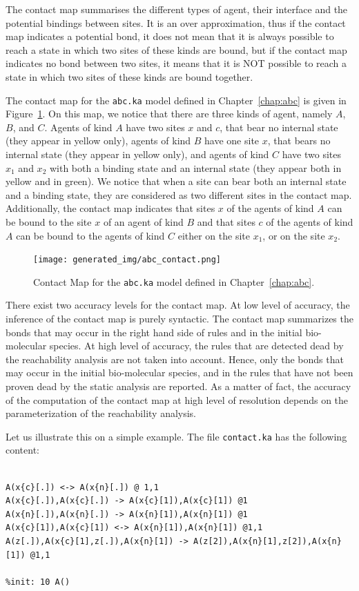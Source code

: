 \documentclass[11pt]{book}
\def\ttt#1{\texttt{#1}}
\begin{document}
The contact map summarises the different types of agent, their interface and the potential bindings between sites. It is an over approximation, thus if the contact map indicates a potential bond, it does not mean that it is always possible to reach a state in which two sites of these kinds are bound, but if the contact map indicates no bond between two sites, it means that it is NOT possible to reach a state in which two sites of these kinds are bound together.


The contact map for the \ttt{abc.ka} model  defined in Chapter~\ref{chap:abc} is given in Figure~\ref{fig:abc-contact}. On this map, we notice that there are three kinds of agent, namely $A$, $B$, and $C$.
Agents of kind $A$ have two sites $x$ and $c$, that bear no internal state (they appear in yellow only), agents of kind $B$ have one site $x$, that bears no internal state (they appear in yellow only), and agents of kind $C$ have two sites $x_1$ and $x_2$ with both a binding state and an internal state (they appear both in yellow and in green). We notice that when a site can bear both an internal state and a binding state, they are considered as two different sites in the contact map. Additionally, the contact map indicates that sites $x$ of the agents of kind $A$ can be bound to the site $x$ of an agent of kind $B$ and that sites $c$ of the agents of kind $A$ can be bound to the agents of kind $C$ either on the site $x_1$, or on the site $x_2$.

\begin{figure}[htbp]
\centering
\texttt{[image: generated\_img/abc\_contact.png]}
\caption{Contact Map for the \ttt{abc.ka} model defined in Chapter~\ref{chap:abc}.}
\label{fig:abc-contact}
\end{figure}


There exist two accuracy levels for the contact map.
At low level of accuracy, the inference of the contact map is purely syntactic. The contact map summarizes the bonds that may occur in the right hand side of rules and in the initial bio-molecular species.
At high level of accuracy, the rules that are detected dead by the reachability analysis are not taken into account. Hence, only the bonds that may occur in the initial bio-molecular species, and in the rules that have not been proven dead by the static analysis are reported. As a matter of fact, the accuracy of the computation of the contact map at high level of resolution depends on the parameterization of the reachability analysis.

Let us illustrate this on a simple example. The file \texttt{contact.ka} has the following content:
\begin{lstlisting}[language=kappa]
%agent: A(x{c,n},z)

A(x{c}[.]) <-> A(x{n}[.]) @ 1,1
A(x{c}[.]),A(x{c}[.]) -> A(x{c}[1]),A(x{c}[1]) @1
A(x{n}[.]),A(x{n}[.]) -> A(x{n}[1]),A(x{n}[1]) @1
A(x{c}[1]),A(x{c}[1]) <-> A(x{n}[1]),A(x{n}[1]) @1,1
A(z[.]),A(x{c}[1],z[.]),A(x{n}[1]) -> A(z[2]),A(x{n}[1],z[2]),A(x{n}[1]) @1,1

%init: 10 A()
\end{lstlisting}
\end{document}
